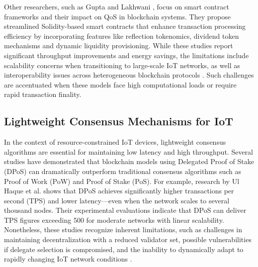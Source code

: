 \documentclass[12pt,onecolumn]{IEEEtran} %
\begin{document}
Other researchers, such as Gupta and Lakhwani \cite{gupta2025enhancingblockchainqualityofservice}, focus on smart contract frameworks and their impact on QoS in blockchain systems. They propose streamlined Solidity-based smart contracts that enhance transaction processing efficiency by incorporating features like reflection tokenomics, dividend token mechanisms and dynamic liquidity provisioning. While these studies report significant throughput improvements and energy savings, the limitations include scalability concerns when transitioning to large-scale IoT networks, as well as interoperability issues across heterogeneous blockchain protocols \cite{gupta2025enhancingblockchainqualityofservice}. Such challenges are accentuated when these models face high computational loads or require rapid transaction finality.

\subsection*{Lightweight Consensus Mechanisms for IoT}
In the context of resource-constrained IoT devices, lightweight consensus algorithms are essential for maintaining low latency and high throughput. Several studies have demonstrated that blockchain models using Delegated Proof of Stake (DPoS) can dramatically outperform traditional consensus algorithms such as Proof of Work (PoW) and Proof of Stake (PoS). For example, research by Ul Haque et al. \cite{haque2024ascalableblockchain} shows that DPoS achieves significantly higher transactions per second (TPS) and lower latency---even when the network scales to several thousand nodes. Their experimental evaluations indicate that DPoS can deliver TPS figures exceeding 500 for moderate networks with linear scalability. Nonetheless, these studies recognize inherent limitations, such as challenges in maintaining decentralization with a reduced validator set, possible vulnerabilities if delegate selection is compromised, and the inability to dynamically adapt to rapidly changing IoT network conditions \cite{haque2024ascalableblockchain}.
\end{document}
